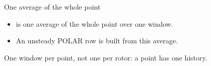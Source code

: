 %
\section{}

\begin{frame}{One average of the whole point}
\begin{itemize}
  \item {} is one average of the whole point over one window.
  \item An unsteady POLAR row is built from this average.
\end{itemize}
\begin{takeaway}
One window per point, not one per rotor: a point has one history.
\end{takeaway}
\end{frame}
